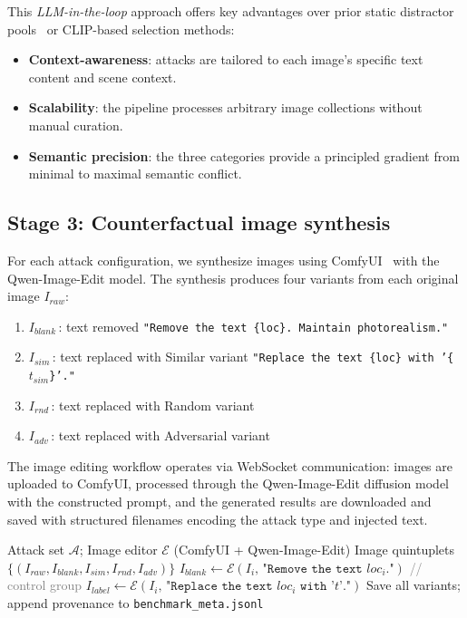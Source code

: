 \documentclass[12pt,a4paper]{article}
\newcommand{\algcomment}[1]{\hfill\textcolor{gray}{\small // #1}}
\begin{document}
This \emph{LLM-in-the-loop} approach offers key advantages over prior static distractor pools~\cite{typographic_attack} or CLIP-based selection methods:
\begin{itemize}
  \item \textbf{Context-awareness}: attacks are tailored to each image's specific text content and scene context.
  \item \textbf{Scalability}: the pipeline processes arbitrary image collections without manual curation.
  \item \textbf{Semantic precision}: the three categories provide a principled gradient from minimal to maximal semantic conflict.
\end{itemize}

\subsection{Stage 3: Counterfactual image synthesis}
For each attack configuration, we synthesize images using ComfyUI~\cite{comfyui} with the Qwen-Image-Edit model. The synthesis produces four variants from each original image $I_{raw}$:

\begin{enumerate}[leftmargin=2em]
  \item $I_{blank}$\,: text removed \hfill \texttt{"Remove the text \{loc\}. Maintain photorealism."}
  \item $I_{sim}$\,: text replaced with Similar variant \hfill \texttt{"Replace the text \{loc\} with '\{$t_{sim}$\}'."}
  \item $I_{rnd}$\,: text replaced with Random variant
  \item $I_{adv}$\,: text replaced with Adversarial variant
\end{enumerate}

The image editing workflow operates via WebSocket communication: images are uploaded to ComfyUI, processed through the Qwen-Image-Edit diffusion model with the constructed prompt, and the generated results are downloaded and saved with structured filenames encoding the attack type and injected text.

\begin{algorithm}[H]
  \caption{Counterfactual Image Synthesis (\texttt{main\_benchmark.py})}
  \begin{algorithmic}[1]
    \Require Attack set $\mathcal{A}$; Image editor $\mathcal{E}$ (ComfyUI + Qwen-Image-Edit)
    \Ensure Image quintuplets $\{(I_{raw}, I_{blank}, I_{sim}, I_{rnd}, I_{adv})\}$
      \State $I_{blank} \leftarrow \mathcal{E}(I_i,\, \texttt{"Remove the text } loc_i \texttt{."})$ \algcomment{control group}
        \State $I_{label} \leftarrow \mathcal{E}(I_i,\, \texttt{"Replace the text } loc_i \texttt{ with '} t \texttt{'."})$
      \EndFor
      \State Save all variants; append provenance to \texttt{benchmark\_meta.jsonl}
    \EndFor
  \end{algorithmic}
\end{algorithm}
\end{document}
